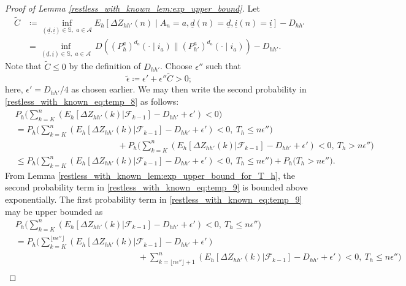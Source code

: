 \begin{proof}[Proof of Lemma \ref{restless_with_known_lem:exp_upper_bound}]
Let 
\begin{align}
	\tilde{C}&\coloneqq \inf\limits_{(\underline{d},\underline{i})\in\mathbb{S},\,\,a\in\mathcal{A}}E_h[\Delta Z_{hh'}(n)\mid A_n=a,\underline{d}(n)=\underline{d},\underline{i}(n)=\underline{i}]-D_{hh'} \nonumber\\
	&= \inf\limits_{(\underline{d},\underline{i})\in\mathbb{S},\,\,a\in\mathcal{A}}~D((P_h^a)^{d_a}(\cdot\mid i_a)\|(P_{h'}^a)^{d_a}(\cdot\mid i_a))-D_{hh'}.\label{restless_with_known_eq:C_tilde}
\end{align}
Note that $\tilde{C}\leq 0$ by the definition of $D_{hh'}$. Choose $\epsilon''$ such that $$\tilde{\epsilon}\coloneqq \epsilon'+\epsilon'' \tilde{C}>0;$$ here, $\epsilon'=D_{hh'}/4$ as chosen earlier. We may then write the second probability in \eqref{restless_with_known_eq:temp_8} as follows:
\begin{align}
	&P_h\bigg(\sum\limits_{k=K}^n (E_h[\Delta Z_{hh'}(k)|\mathcal{F}_{k-1}]-D_{hh'}+\epsilon')<0\bigg)\nonumber\\
	&= P_h\bigg(\sum\limits_{k=K}^n (E_h[\Delta Z_{hh'}(k)|\mathcal{F}_{k-1}]-D_{hh'}+\epsilon')<0,~T_h\leq n\epsilon''\bigg)\nonumber\\
	&\hspace{5cm}+P_h\bigg(\sum\limits_{k=K}^n (E_h[\Delta Z_{hh'}(k)|\mathcal{F}_{k-1}]-D_{hh'}+\epsilon')<0,~T_h>n\epsilon''\bigg)\nonumber\\
	&\leq  P_h\bigg(\sum\limits_{k=K}^n (E_h[\Delta Z_{hh'}(k)|\mathcal{F}_{k-1}]-D_{hh'}+\epsilon')<0,~T_h\leq n\epsilon''\bigg)+P_h\bigg(T_h>n\epsilon''\bigg).\label{restless_with_known_eq:temp_9}
\end{align}
From Lemma \ref{restless_with_known_lem:exp_upper_bound_for_T_h}, the second probability term in \eqref{restless_with_known_eq:temp_9} is bounded above exponentially. The first probability term in \eqref{restless_with_known_eq:temp_9} may be upper bounded as
\begin{align}
	&P_h\bigg(\sum\limits_{k=K}^n (E_h[\Delta Z_{hh'}(k)|\mathcal{F}_{k-1}]-D_{hh'}+\epsilon')<0,~T_h\leq n\epsilon''\bigg)\nonumber\\
	&= P_h\bigg(\sum\limits_{k=K}^{\lfloor n\epsilon''\rfloor} (E_h[\Delta Z_{hh'}(k)|\mathcal{F}_{k-1}]-D_{hh'}+{\epsilon'})\nonumber\\
	&\hspace{6cm}+ \sum\limits_{k=\lfloor n\epsilon''\rfloor+1}^n (E_h[\Delta Z_{hh'}(k)|\mathcal{F}_{k-1}]-D_{hh'}+{\epsilon'})<0,~T_h\leq n\epsilon''\bigg)\nonumber\\

\end{align}
\end{proof}
